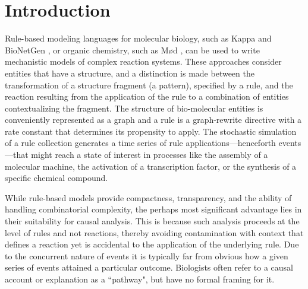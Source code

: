 
\section{Introduction}\label{sec:intro}

Rule-based modeling languages for molecular biology, such as Kappa
\cite{DanosEtAl-CONCUR07} and BioNetGen \cite{bngl}, or organic
chemistry, such as M{\o}d \cite{moll}, can be used to write
mechanistic models of complex reaction systems. These approaches
consider entities that have a structure, and a distinction is made
between the transformation of a structure fragment (a pattern),
specified by a rule, and the reaction resulting from the application
of the rule to a combination of entities contextualizing the
fragment. The structure of bio-molecular entities is conveniently
represented as a graph and a rule is a graph-rewrite directive with a
rate constant that determines its propensity to apply. The stochastic
simulation of a rule collection generates a time series of rule
applications---henceforth events---that might reach a state of
interest in processes like the assembly of a molecular machine, the
activation of a transcription factor, or the synthesis of a specific
chemical compound.

While rule-based models provide compactness, transparency, and the
ability of handling combinatorial complexity, the perhaps most
significant advantage lies in their suitability for causal
analysis. This is because such analysis proceeds at the level of rules
and not reactions, thereby avoiding contamination with context that
defines a reaction yet is accidental to the application of the
underlying rule. Due to the concurrent nature of events it is
typically far from obvious how a given series of events attained a
particular outcome. Biologists often refer to a causal account or
explanation as a ``pathway", but have no formal framing for it.


